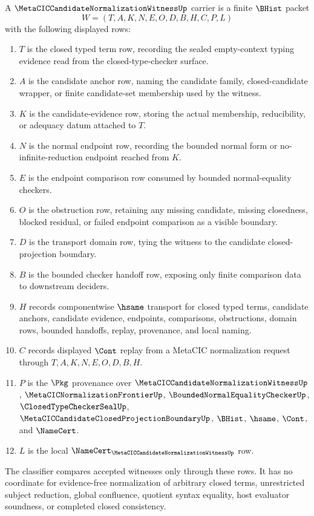 \begin{definition}
\label{def:metacic-candidate-normalization-witness-carrier}
A $\MetaCICCandidateNormalizationWitnessUp$ carrier is a finite $\BHist$ packet
$$
W=(T,A,K,N,E,O,D,B,H,C,P,L)
$$
with the following displayed rows:
\begin{enumerate}
\item $T$ is the closed typed term row, recording the sealed empty-context typing evidence read from the closed-type-checker surface.
\item $A$ is the candidate anchor row, naming the candidate family, closed-candidate wrapper, or finite candidate-set membership used by the witness.
\item $K$ is the candidate-evidence row, storing the actual membership, reducibility, or adequacy datum attached to $T$.
\item $N$ is the normal endpoint row, recording the bounded normal form or no-infinite-reduction endpoint reached from $K$.
\item $E$ is the endpoint comparison row consumed by bounded normal-equality checkers.
\item $O$ is the obstruction row, retaining any missing candidate, missing closedness, blocked residual, or failed endpoint comparison as a visible boundary.
\item $D$ is the transport domain row, tying the witness to the candidate closed-projection boundary.
\item $B$ is the bounded checker handoff row, exposing only finite comparison data to downstream deciders.
\item $H$ records componentwise $\hsame$ transport for closed typed terms, candidate anchors, candidate evidence, endpoints, comparisons, obstructions, domain rows, bounded handoffs, replay, provenance, and local naming.
\item $C$ records displayed $\Cont$ replay from a MetaCIC normalization request through $T,A,K,N,E,O,D,B,H$.
\item $P$ is the $\Pkg$ provenance over $\MetaCICCandidateNormalizationWitnessUp$, $\MetaCICNormalizationFrontierUp$, $\BoundedNormalEqualityCheckerUp$, $\ClosedTypeCheckerSealUp$, $\MetaCICCandidateClosedProjectionBoundaryUp$, $\BHist$, $\hsame$, $\Cont$, and $\NameCert$.
\item $L$ is the local $\NameCert_{\MetaCICCandidateNormalizationWitnessUp}$ row.
\end{enumerate}
The classifier compares accepted witnesses only through these rows. It has no coordinate for evidence-free normalization of arbitrary closed terms, unrestricted subject reduction, global confluence, quotient syntax equality, host evaluator soundness, or completed closed consistency.
\end{definition}

